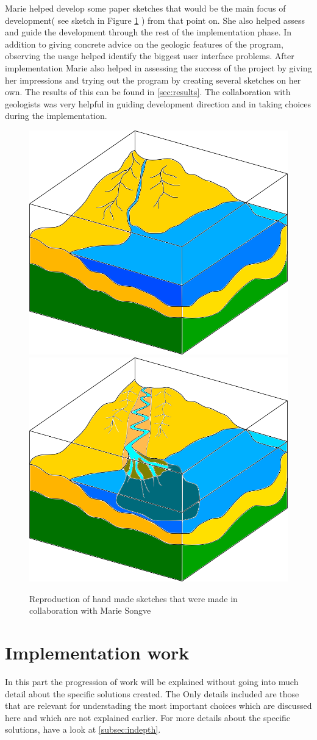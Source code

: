 \documentclass[a4paper,12pt]{report}
\newcommand{\secref}[1]{\autoref{#1}}
\begin{document}
Marie helped develop some paper sketches that would be the main focus of development( see sketch in Figure \ref{fig:illuSketch} ) from that point on. She also helped assess and guide the development through the rest of the implementation phase. In addition to giving concrete advice on the geologic features of the program, observing the usage helped identify the biggest user interface problems. After implementation Marie also helped in assessing the success of the project by giving her impressions and trying out the program by creating several sketches on her own. The results of this can be found in \secref{sec:results}. The collaboration with geologists was very helpful in guiding development direction and in taking choices during the implementation.


\begin{figure}
 \centering
\includegraphics[width=.4\linewidth]{thesis/illuSketch1.png}
\includegraphics[width=.4\linewidth]{thesis/illuSketch2.png}
 \caption{Reproduction of hand made sketches that were made in collaboration with Marie Songve}
 \label{fig:illuSketch}
\end{figure}

\section{Implementation work}

In this part the progression of work will be explained without going into much detail about the specific solutions created. The Only details included are those that are relevant for understading the most important choices which are discussed here and which are not explained earlier. For more details about the specific solutions, have a look at \secref{subsec:indepth}.
\end{document}
